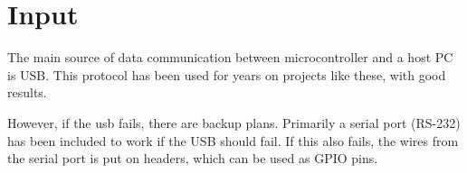 \documentclass[../main/report.tex]{subfiles}
\begin{document}
\section{Input}

The main source of data communication between microcontroller and a host PC is USB.
This protocol has been used for years on projects like these, with good results. 

However, if the usb fails, there are backup plans.
Primarily a serial port (RS-232) has been included to work if the USB should fail.
If this also fails, the wires from the serial port is put on headers, which can be used as GPIO pins.
\end{document}
